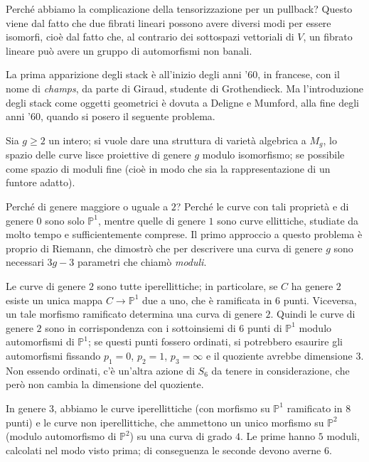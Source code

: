 \documentclass[english,course]{Notes}
\begin{document}
Perché abbiamo la complicazione della tensorizzazione per un pullback? Questo viene dal fatto che due fibrati lineari possono avere diversi modi per essere isomorfi, cioè dal fatto che, al contrario dei sottospazi vettoriali di $V$, un fibrato lineare può avere un gruppo di automorfismi non banali.

La prima apparizione degli stack è all'inizio degli anni '60, in francese, con il nome di \emph{champs}, da parte di Giraud, studente di Grothendieck. Ma l'introduzione degli stack come oggetti geometrici è dovuta a Deligne e Mumford, alla fine degli anni '60, quando si posero il seguente problema.

\begin{problem}
  Sia $g ≥ 2$ un intero; si vuole dare una struttura di varietà algebrica a $M_g$, lo spazio delle curve lisce proiettive di genere $g$ modulo isomorfismo; se possibile come spazio di moduli fine (cioè in modo che sia la rappresentazione di un funtore adatto).
\end{problem}

Perché di genere maggiore o uguale a $2$? Perché le curve con tali proprietà e di genere $0$ sono solo $ℙ^1$, mentre quelle di genere $1$ sono curve ellittiche, studiate da molto tempo e sufficientemente comprese. Il primo approccio a questo problema è proprio di Riemann, che dimostrò che per descrivere una curva di genere $g$ sono necessari $3g-3$ parametri che chiamò \emph{moduli}.

\begin{example}
  Le curve di genere $2$ sono tutte iperellittiche; in particolare, se $C$ ha genere $2$ esiste un unica mappa $C → ℙ^1$ due a uno, che è ramificata in $6$ punti. Viceversa, un tale morfismo ramificato determina una curva di genere $2$. Quindi le curve di genere $2$ sono in corrispondenza con i sottoinsiemi di $6$ punti di $ℙ^1$ modulo automorfismi di $ℙ^1$; se questi punti fossero ordinati, si potrebbero esaurire gli automorfismi fissando $p_1 = 0$, $p_2 = 1$, $p_3 = ∞$ e il quoziente avrebbe dimensione $3$. Non essendo ordinati, c'è un'altra azione di $S_6$ da tenere in considerazione, che però non cambia la dimensione del quoziente.
\end{example}

\begin{example}
  In genere $3$, abbiamo le curve iperellittiche (con morfismo su $ℙ^1$ ramificato in $8$ punti) e le curve non iperellittiche, che ammettono un unico morfismo su $ℙ^2$ (modulo automorfismo di $ℙ^2$) su una curva di grado $4$. Le prime hanno $5$ moduli, calcolati nel modo visto prima; di conseguenza le seconde devono averne $6$.
\end{example}
\end{document}
